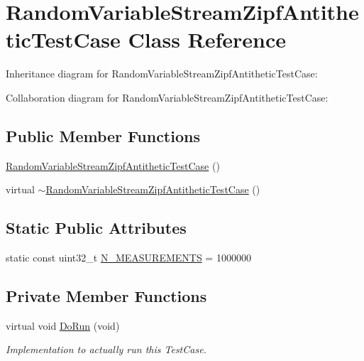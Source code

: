 \hypertarget{classRandomVariableStreamZipfAntitheticTestCase}{}\section{Random\+Variable\+Stream\+Zipf\+Antithetic\+Test\+Case Class Reference}
\label{classRandomVariableStreamZipfAntitheticTestCase}


Inheritance diagram for Random\+Variable\+Stream\+Zipf\+Antithetic\+Test\+Case\+:


Collaboration diagram for Random\+Variable\+Stream\+Zipf\+Antithetic\+Test\+Case\+:
\subsection*{Public Member Functions}
\begin{DoxyCompactItemize}
\item 
\hyperlink{classRandomVariableStreamZipfAntitheticTestCase_aa500265ba774e1438f918bc7b612e734}{Random\+Variable\+Stream\+Zipf\+Antithetic\+Test\+Case} ()
\item 
virtual \hyperlink{classRandomVariableStreamZipfAntitheticTestCase_a66592535a22f29516f70cbc072b1d310}{$\sim$\+Random\+Variable\+Stream\+Zipf\+Antithetic\+Test\+Case} ()
\end{DoxyCompactItemize}
\subsection*{Static Public Attributes}
\begin{DoxyCompactItemize}
\item 
static const uint32\+\_\+t \hyperlink{classRandomVariableStreamZipfAntitheticTestCase_aa6e592d5004d13804492847b87c51adb}{N\+\_\+\+M\+E\+A\+S\+U\+R\+E\+M\+E\+N\+TS} = 1000000
\end{DoxyCompactItemize}
\subsection*{Private Member Functions}
\begin{DoxyCompactItemize}
\item 
virtual void \hyperlink{classRandomVariableStreamZipfAntitheticTestCase_a09c7d1e05440c0621417aed87b8e67ac}{Do\+Run} (void)
\begin{DoxyCompactList}\small\item\em Implementation to actually run this Test\+Case. \end{DoxyCompactList}\end{DoxyCompactItemize}
